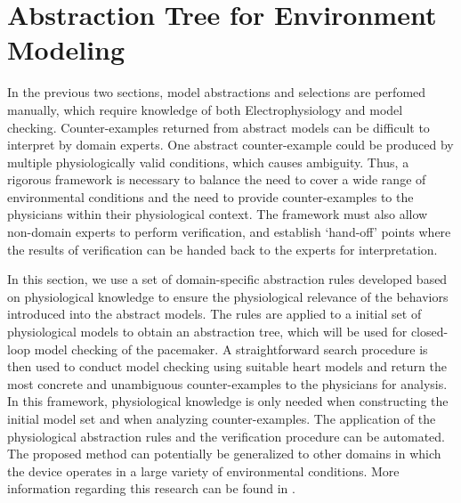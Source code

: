 \section{Abstraction Tree for Environment Modeling}
In the previous two sections, model abstractions and selections are perfomed manually, which require knowledge of both Electrophysiology and model checking. 
Counter-examples returned from abstract models can be difficult to interpret by domain experts.
One abstract counter-example could be produced by multiple physiologically valid conditions, which causes ambiguity.
Thus, a rigorous framework is necessary to balance the need to cover a wide range of environmental conditions and the need to provide counter-examples to the physicians within their physiological context. The framework must also allow non-domain experts to perform verification, and establish `hand-off' points where the results of verification can be handed back 
to the experts for interpretation.

In this section, we use a set of domain-specific abstraction rules developed based on physiological knowledge to ensure the physiological relevance of the behaviors introduced into the abstract models.
The rules are applied to a initial set of physiological models to obtain an abstraction tree, which will be used for closed-loop model checking of the pacemaker. 
A straightforward search procedure is then used to conduct model checking using suitable heart models and return the most concrete and unambiguous counter-examples to the physicians for analysis.
In this framework, physiological knowledge is only needed when constructing the initial model set and when analyzing counter-examples. 
The application of the physiological abstraction rules and the verification procedure can be automated.
The proposed method can potentially be generalized to other domains in which the device operates in a large variety of environmental conditions. More information regarding this research can be found in \cite{regar_tech}.
